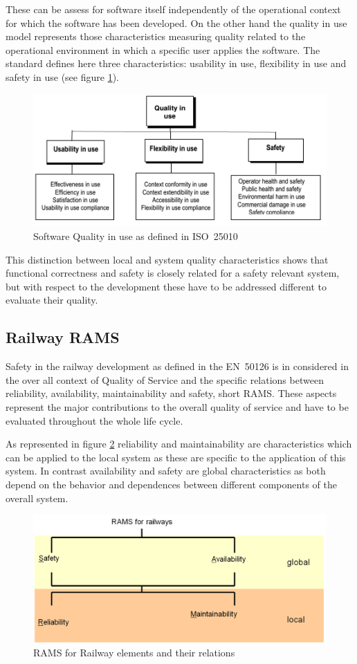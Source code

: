 \documentclass{template/openetcs_report}
\begin{document}
These can be assess for software itself independently of the operational  context for which the software has been developed. On the other hand the quality in use model represents those characteristics measuring quality related to the operational environment in which a specific user applies the software. The standard defines here three characteristics: 
usability in use, flexibility in use and safety in use (see figure \ref{fig:Software-Quality-in-use}).

\begin{figure}[htbp]
\centering
\includegraphics[width=0.7\linewidth]{Software-Quality-in-use}
\caption{Software Quality in use as defined in ISO~25010}
\label{fig:Software-Quality-in-use}
\end{figure}

This distinction between local and system quality characteristics shows that functional correctness and safety is closely related for a safety relevant system, but with respect to the development these have to be addressed different to evaluate their quality.

\subsection{Railway RAMS}

Safety in the railway development as defined in the EN~50126 is in considered in the over all context of Quality of Service and the specific relations between reliability, availability, maintainability and safety, short RAMS. These aspects represent the major contributions to the overall quality of service and have to be evaluated throughout the whole life cycle.

As represented in figure \ref{fig:RAMS-EN50126} reliability and maintainability are characteristics which can be applied to the local system as these are specific to the application of this system. In contrast availability and safety are global characteristics as both depend on the behavior and dependences between different components of the overall system.

\begin{figure}[htbp]
\centering
\includegraphics[width=0.7\linewidth]{images/bld_RAMS-Railway-50126}
\caption{RAMS for Railway elements and their relations \cite{Schnieder.2013}}
\label{fig:RAMS-EN50126}
\end{figure}
\end{document}
